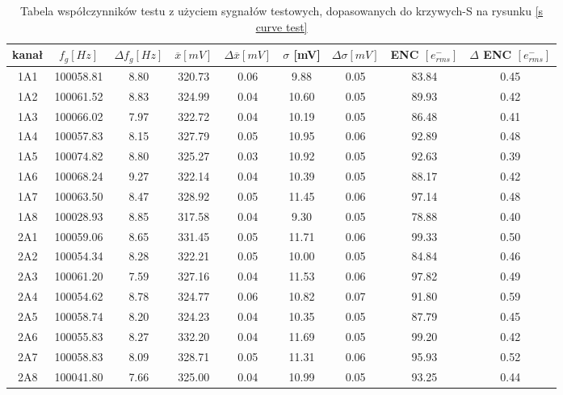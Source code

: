 \begin{table}
        \caption{Tabela współczynników testu z użyciem sygnałów testowych, dopasowanych do krzywych-S na rysunku \ref{s curve test}}
        \label{tabela wsp test}
        \begin{adjustbox}{width=1.1\linewidth,center}
        \begin{tabular}{|c|c|c|c|c|c|c|c|c|}
                \hline
                kanał & $f_g [Hz]$&$\Delta f_g [Hz]$&$\overline{x} [mV]$&$\Delta \overline{x} [mV]$&  $\sigma$ [mV]&  $\Delta \sigma [mV]$ & ENC $[e^-_{rms}]$& $\Delta$ ENC $[e^-_{rms}]$\\ \hline

                        1A1&100058.81&8.80&320.73&0.06&9.88&0.05&83.84&0.45 \\ \hline 
                        1A2&100061.52&8.83&324.99&0.04&10.60&0.05&89.93&0.42 \\ \hline 
                        1A3&100066.02&7.97&322.72&0.04&10.19&0.05&86.48&0.41 \\ \hline 
                        1A4&100057.83&8.15&327.79&0.05&10.95&0.06&92.89&0.48 \\ \hline 
                        1A5&100074.82&8.80&325.27&0.03&10.92&0.05&92.63&0.39 \\ \hline 
                        1A6&100068.24&9.27&322.14&0.04&10.39&0.05&88.17&0.42 \\ \hline 
                        1A7&100063.50&8.47&328.92&0.05&11.45&0.06&97.14&0.48 \\ \hline 
                        1A8&100028.93&8.85&317.58&0.04&9.30&0.05&78.88&0.40 \\ \hline 
                        2A1&100059.06&8.65&331.45&0.05&11.71&0.06&99.33&0.50 \\ \hline 
                        2A2&100054.34&8.28&322.21&0.05&10.00&0.05&84.84&0.46 \\ \hline 
                        2A3&100061.20&7.59&327.16&0.04&11.53&0.06&97.82&0.49 \\ \hline 
                        2A4&100054.62&8.78&324.77&0.06&10.82&0.07&91.80&0.59 \\ \hline 
                        2A5&100058.74&8.20&324.23&0.04&10.35&0.05&87.79&0.45 \\ \hline 
                        2A6&100055.83&8.27&332.20&0.04&11.69&0.05&99.20&0.42 \\ \hline 
                        2A7&100058.83&8.09&328.71&0.05&11.31&0.06&95.93&0.52 \\ \hline 
                        2A8&100041.80&7.66&325.00&0.04&10.99&0.05&93.25&0.44 \\ \hline                    
        \end{tabular}
        \end{adjustbox} 
\end{table}


